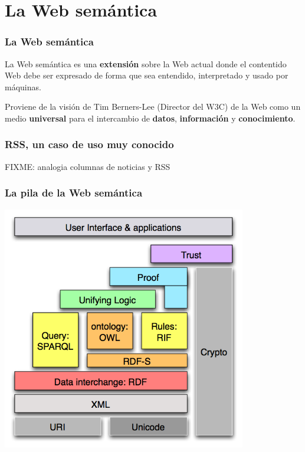 \documentclass[spanish,notes=hide]{beamer}
\begin{document}
\section{La Web semántica}
\frame
{
  \frametitle{La Web semántica}

  \begin{Large}
    La Web semántica es una \textbf{extensión} sobre la Web actual donde el 
    contentido Web debe ser expresado de forma que sea entendido, interpretado 
    y usado por máquinas.
  \end{Large}
  
  \vspace{1cm}

  \begin{Large}
    Proviene de la visión de Tim Berners-Lee (Director del W3C) de la Web como un
    medio \textbf{universal} para el intercambio de \textbf{datos}, \textbf{información} 
    y \textbf{conocimiento}.
  \end{Large}
}
\frame
{
  \frametitle{RSS, un caso de uso muy conocido}

  FIXME: analogia columnas de noticias y RSS
}
\frame
{
  \frametitle{La pila de la Web semántica}

  \begin{center}
    \includegraphics[width=0.8\textwidth]{images/semantic-web-stack.png}
  \end{center}

}
\frame
\end{document}
